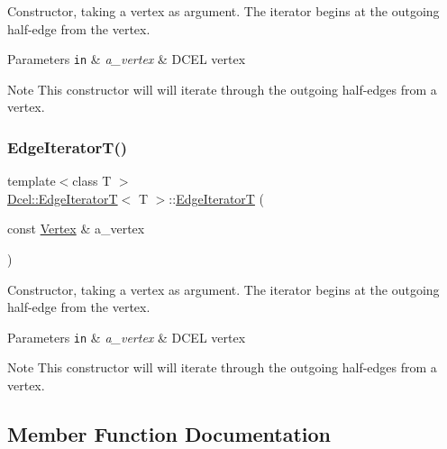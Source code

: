 Constructor, taking a vertex as argument. The iterator begins at the outgoing half-\/edge from the vertex. 


\begin{DoxyParams}[1]{Parameters}
\mbox{\tt in}  & {\em a\+\_\+vertex} & D\+C\+EL vertex \\
\hline
\end{DoxyParams}
\begin{DoxyNote}{Note}
This constructor will will iterate through the outgoing half-\/edges from a vertex. 
\end{DoxyNote}
\mbox{\label{classDcel_1_1EdgeIteratorT_abda0210d73dd861142c8e23b4d589bd0}} 
\subsubsection{\texorpdfstring{Edge\+Iterator\+T()}{EdgeIteratorT()}\hspace{0.1cm}{\footnotesize\ttfamily [4/4]}}
{\footnotesize\ttfamily template$<$class T $>$ \\
\hyperlink{classDcel_1_1EdgeIteratorT}{Dcel\+::\+Edge\+IteratorT}$<$ T $>$\+::\hyperlink{classDcel_1_1EdgeIteratorT}{Edge\+IteratorT} (\begin{DoxyParamCaption}\item[{const \hyperlink{classDcel_1_1EdgeIteratorT_a4ca07f27da7faf50db5dbd1f20bbcafb}{Vertex} \&}]{a\+\_\+vertex }\end{DoxyParamCaption})\hspace{0.3cm}{\ttfamily [inline]}}



Constructor, taking a vertex as argument. The iterator begins at the outgoing half-\/edge from the vertex. 


\begin{DoxyParams}[1]{Parameters}
\mbox{\tt in}  & {\em a\+\_\+vertex} & D\+C\+EL vertex \\
\hline
\end{DoxyParams}
\begin{DoxyNote}{Note}
This constructor will will iterate through the outgoing half-\/edges from a vertex. 
\end{DoxyNote}


\subsection{Member Function Documentation}
\mbox{\label{classDcel_1_1EdgeIteratorT_a92bfca2d072bbf54c7be751f8fc4c098}} 
